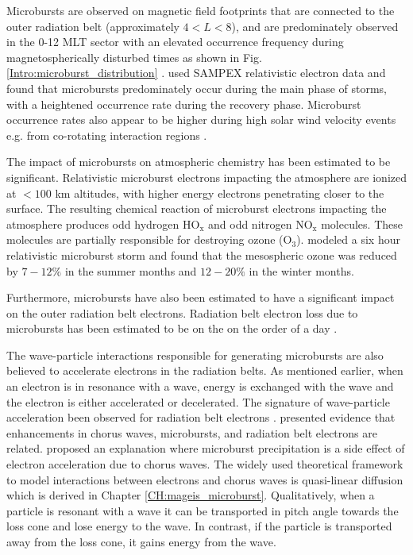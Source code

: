 Microbursts are observed on magnetic field footprints that are connected to the outer radiation belt (approximately $4 < L < 8$), and are predominately observed in the 0-12 MLT sector with an elevated occurrence frequency during magnetospherically disturbed times as shown in Fig. \ref{Intro:microburst_distribution} \citep[e.g.][]{Douma2017}. \citet{O'Brien2003} used SAMPEX relativistic electron data and found that microbursts predominately occur during the main phase of storms, with a heightened occurrence rate during the recovery phase. Microburst occurrence rates also appear to be higher during high solar wind velocity events e.g. from co-rotating interaction regions \citep{O'Brien2003, Greeley2019}.

The impact of microbursts on atmospheric chemistry has been estimated to be significant. Relativistic microburst electrons impacting the atmosphere are ionized at $<100$ km altitudes, with higher energy electrons penetrating closer to the surface. The resulting chemical reaction of microburst electrons impacting the atmosphere produces odd hydrogen $\mathrm{HO_x}$ and odd nitrogen $\mathrm{NO_x}$ molecules. These molecules are partially responsible for destroying ozone ($\mathrm{O_3}$). \citet{Seppala2018} modeled a six hour relativistic microburst storm and found that the mesospheric ozone was reduced by $7-12 \%$ in the summer months and $12-20 \%$ in the winter months. 

Furthermore, microbursts have also been estimated to have a significant impact on the outer radiation belt electrons. Radiation belt electron loss due to microbursts has been estimated to be on the on the order of a day \citep{Lorentzen2001b, O'Brien2004, Thorne2005, Breneman2017, Douma2019}. 

The wave-particle interactions responsible for generating microbursts are also believed to accelerate electrons in the radiation belts. As mentioned earlier, when an electron is in resonance with a wave, energy is exchanged with the wave and the electron is either accelerated or decelerated. The signature of wave-particle acceleration been observed for radiation belt electrons \citep[e.g.][]{Meredith2002, Horne2005, Reeves2013}. \citet{O'Brien2003} presented evidence that enhancements in chorus waves, microbursts, and radiation belt electrons are related. \citet{O'Brien2003} proposed an explanation where microburst precipitation is a side effect of electron acceleration due to chorus waves. The widely used theoretical framework to model interactions between electrons and chorus waves is quasi-linear diffusion \citep[e.g.][]{Walker1993, Summers1998, Meredith2002, Horne2005, Thorne2005, Summers2005} which is derived in Chapter \ref{CH:mageis_microburst}. Qualitatively, when a particle is resonant with a wave it can be transported in pitch angle towards the loss cone and lose energy to the wave. In contrast, if the particle is transported away from the loss cone, it gains energy from the wave.


